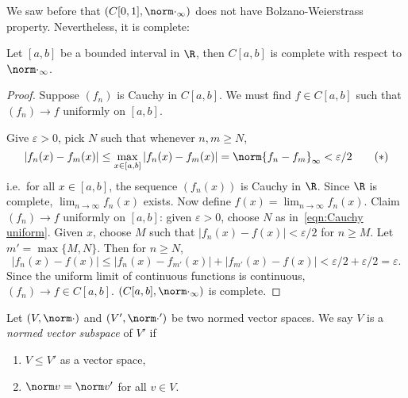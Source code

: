\documentclass[a4paper]{article}
\theoremstyle{definition}
\begin{document}
We saw before that \((C[0, 1], \norm \cdot_\infty)\) does not have Bolzano-Weierstrass property. Nevertheless, it is complete:

\begin{theorem}
  Let \([a, b]\) be a bounded interval in \(\R\), then \(C[a, b]\) is complete with respect to \(\norm \cdot_\infty\).
\end{theorem}

\begin{proof}
  Suppose \((f_n)\) is Cauchy in \(C[a, b]\). We must find \(f\in C[a, b]\) such that \((f_n) \to f\) uniformly on \([a, b]\).

  Give \(\varepsilon > 0\), pick \(N\) such that whenever \(n,m \geq N\),
  \begin{equation}
    \label{eqn:Cauchy uniform}
    |f_n(x) - f_m(x)| \leq \max_{x \in [a,b]}|f_n(x) - f_m(x)| = \norm{f_n - f_m}_\infty < \varepsilon/2
    \tag{\(\ast\)}
  \end{equation}
  i.e.\ for all \(x \in [a, b]\), the sequence \((f_n(x))\) is Cauchy in \(\R\). Since \(\R\) is complete, \(\lim_{n \to \infty}f_n(x)\) exists. Now define \(f(x) = \lim_{n \to \infty}f_n(x)\). Claim \((f_n) \to f\) uniformly on \([a, b]\): given \(\varepsilon > 0\), choose \(N\) as in~\eqref{eqn:Cauchy uniform}. Given \(x\), choose \(M\) such that \(|f_n(x) - f(x)| < \varepsilon/2\) for \(n \geq M\). Let \(m' = \max\{M, N\}\). Then for \(n \geq N\),
  \[
    |f_n(x) - f(x)| \leq |f_n(x) - f_{m'}(x)| + |f_{m'}(x) - f(x)| < \varepsilon/2 + \varepsilon/2 = \varepsilon.
  \]
  Since the uniform limit of continuous functions is continuous, \((f_n) \to f \in C[a, b]\). \((C[a, b], \norm \cdot_\infty)\) is complete.
\end{proof}

\begin{definition}
  Let \((V, \norm \cdot)\) and \((V', \norm \cdot')\) be two normed vector spaces. We say \(V\) is a \emph{normed vector subspace} of \(V'\) if
  \begin{enumerate}
  \item \(V \leq V'\) as a vector space,
  \item \(\norm v = \norm v'\) for all \(v \in V\).
  \end{enumerate}

\end{definition}
\end{document}
